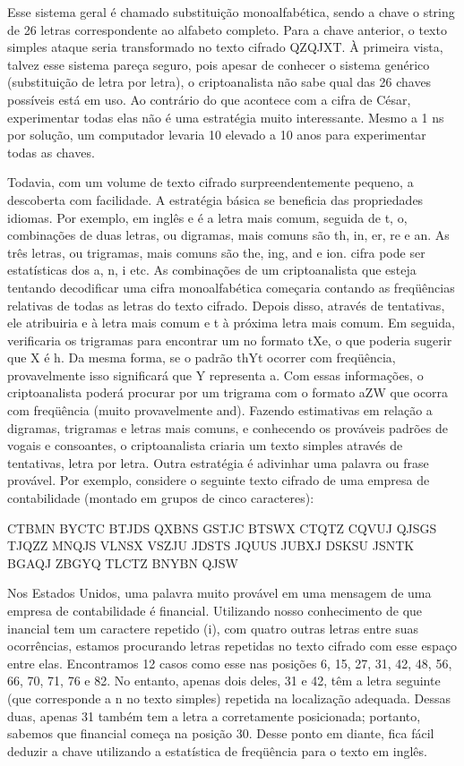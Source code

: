 Esse sistema geral é chamado substituição monoalfabética, sendo a chave o string de 26 letras 
correspondente ao alfabeto completo. Para a chave anterior, o texto simples ataque seria 
transformado no texto cifrado QZQJXT. 
À primeira vista, talvez esse sistema pareça seguro, pois apesar de conhecer o sistema genérico (substituição de letra por letra), o criptoanalista não sabe qual das 26 chaves possíveis está em uso. Ao contrário do que acontece com a cifra de César, experimentar todas elas não é uma estratégia muito interessante. Mesmo a 1 ns por solução, um computador levaria 10 elevado a 10 anos para experimentar todas as chaves. 

Todavia, com um volume de texto cifrado surpreendentemente pequeno, a descoberta com facilidade. A estratégia básica se beneficia das propriedades idiomas. Por exemplo, em inglês e é a letra mais comum, seguida de t, o, combinações de duas letras, ou digramas, mais comuns são th, in, er, re e an. As três letras, ou trigramas, mais comuns são the, ing, and e ion. cifra pode ser estatísticas dos a, n, i etc. As combinações de um criptoanalista que esteja tentando decodificar uma cifra monoalfabética começaria contando as freqüências relativas de todas as letras do texto cifrado. Depois disso, através de tentativas, ele atribuiria e à letra mais comum e t à próxima letra mais comum. Em seguida, verificaria os trigramas para encontrar um no formato tXe, o que poderia sugerir que X é h. Da mesma forma, se o padrão thYt ocorrer com freqüência, provavelmente isso significará que Y representa a. Com essas informações, o criptoanalista poderá procurar por um trigrama com o formato aZW que ocorra com freqüência (muito provavelmente and). Fazendo estimativas em relação a digramas, trigramas e letras mais comuns, e conhecendo os prováveis padrões de vogais e consoantes, o criptoanalista criaria um texto simples através de tentativas, letra por letra. 
Outra estratégia é adivinhar uma palavra ou frase provável. Por exemplo, considere o seguinte 
texto cifrado de uma empresa de contabilidade (montado em grupos de cinco caracteres): 
	

CTBMN BYCTC BTJDS QXBNS GSTJC BTSWX CTQTZ CQVUJ 
QJSGS TJQZZ MNQJS VLNSX VSZJU JDSTS JQUUS JUBXJ 
DSKSU JSNTK BGAQJ ZBGYQ TLCTZ BNYBN QJSW 


Nos Estados Unidos, uma palavra muito provável em uma mensagem de uma empresa de contabilidade é financial. Utilizando nosso conhecimento de que inancial tem um caractere repetido (i), com quatro outras letras entre suas ocorrências, estamos procurando letras repetidas no texto cifrado com esse espaço entre elas. Encontramos 12 casos como esse nas posições 6, 15, 27, 31, 42, 48, 56, 66, 70, 71, 76 e 82. No entanto, apenas dois deles, 31 e 42, têm a letra seguinte (que corresponde a n no texto simples) repetida na localização adequada. Dessas duas, apenas 31 também tem a letra a corretamente posicionada; portanto, sabemos que financial começa na posição 30. Desse ponto em diante, fica fácil deduzir a chave utilizando a estatística de freqüência para o texto em inglês.


